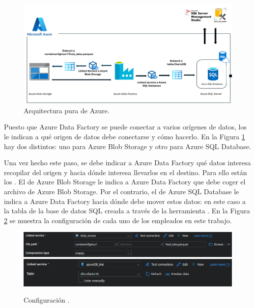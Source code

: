 \begin{figure}[H]
    \centering
    \includegraphics[scale = 0.5]{imgs/azure_arquitecture.png}
    \caption{Arquitectura pura de Azure.}
    \label{realAzure}
\end{figure}

Puesto que Azure Data Factory se puede conectar a varios orígenes de datos, los  le indican a qué origen de datos debe conectarse y cómo hacerlo. En la Figura \ref{realAzure} hay dos  distintos: uno para Azure Blob Storage y otro para Azure SQL Database. 


Una vez hecho este paso, se debe indicar a Azure Data Factory qué datos interesa recopilar del origen y hacia dónde interesa llevarlos en el destino. Para ello están los . El  de Azure Blob Storage le indica a Azure Data Factory que debe coger el archivo  de Azure Blob Storage. Por el contrario, el  de Azure SQL Database le indica a Azure Data Factory hacia dónde debe mover estos datos: en este caso a la tabla  de la base de datos SQL creada a través de la herramienta . En la Figura \ref{Datasets} se muestra la configuración de cada uno de los  empleados en este trabajo.

\begin{figure}[H]
	\centering
	\includegraphics[width = 1\textwidth]{imgs/DatasetAzure}
	\vspace{0.075cm}
	\includegraphics[width = 1\textwidth]{imgs/DatasetAzure2}
	\caption{Configuración .}
	\label{Datasets}
\end{figure}

